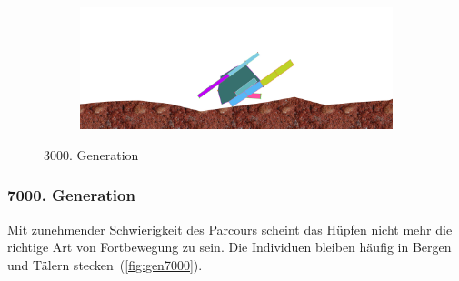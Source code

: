 \begin{figure}[H]
\begin{subfigure}[b]{0.45\textwidth}
            \includegraphics[width=\linewidth,center]{graphics/simulation-results/4_gen3000_4}
            \caption{\label{fig:gen3000_4}}
          \end{subfigure}
          \caption{3000. Generation\label{fig:gen3000}}
        \end{figure}

      \subsubsection{7000. Generation}

        Mit zunehmender Schwierigkeit des Parcours scheint das Hüpfen nicht mehr die richtige Art von Fortbewegung zu sein.
        Die Individuen bleiben häufig in Bergen und Tälern stecken~(\vref{fig:gen7000}).

        \vspace{0.5cm}


